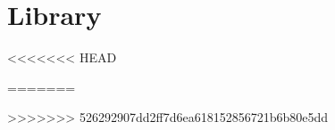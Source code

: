 
\chapter{Library}

<<<<<<< HEAD











=======

>>>>>>> 526292907dd2ff7d6ea618152856721b6b80e5dd

